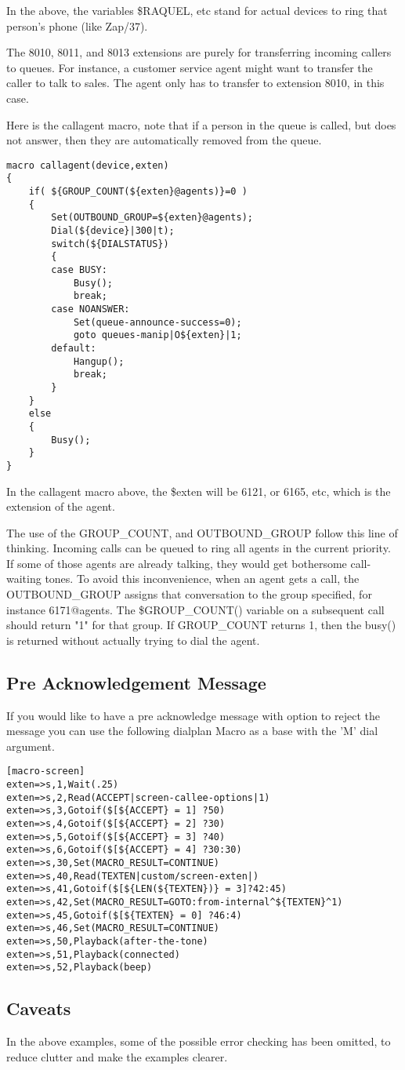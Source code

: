 In the above, the variables \${RAQUEL}, etc stand for
actual devices to ring that person's
phone (like Zap/37).

The 8010, 8011, and 8013 extensions are purely for transferring
incoming callers to queues. For instance, a customer service 
agent might want to transfer the caller to talk to sales. The 
agent only has to transfer to extension 8010, in this case.

Here is the callagent macro, note that if a person in the
queue is called, but does not answer, then they are automatically
removed from the queue.

\begin{verbatim}
macro callagent(device,exten)
{
	if( ${GROUP_COUNT(${exten}@agents)}=0 )
	{
		Set(OUTBOUND_GROUP=${exten}@agents);
		Dial(${device}|300|t);
		switch(${DIALSTATUS})
		{
		case BUSY:
			Busy();
			break;
		case NOANSWER:
			Set(queue-announce-success=0);
			goto queues-manip|O${exten}|1;
		default:
			Hangup();
			break;
		}
	}
	else
	{
		Busy();
	}
}
\end{verbatim}

In the callagent macro above, the \${exten} will
be 6121, or 6165, etc, which is the extension of the agent.

The use of the GROUP\_COUNT, and OUTBOUND\_GROUP follow this line
of thinking. Incoming calls can be queued to ring all agents in the
current priority. If some of those agents are already talking, they
would get bothersome call-waiting tones. To avoid this inconvenience,
when an agent gets a call, the OUTBOUND\_GROUP assigns that 
conversation to the group specified, for instance 6171@agents.
The \${GROUP\_COUNT()} variable on a subsequent call should return
"1" for that group. If GROUP\_COUNT returns 1, then the busy() 
is returned without actually trying to dial the agent.

\subsection{Pre Acknowledgement Message}

If you would like to have a pre acknowledge message with option to reject the message
you can use the following dialplan Macro as a base with the 'M' dial argument.

\begin{verbatim}
[macro-screen]
exten=>s,1,Wait(.25)
exten=>s,2,Read(ACCEPT|screen-callee-options|1)
exten=>s,3,Gotoif($[${ACCEPT} = 1] ?50)
exten=>s,4,Gotoif($[${ACCEPT} = 2] ?30)
exten=>s,5,Gotoif($[${ACCEPT} = 3] ?40)
exten=>s,6,Gotoif($[${ACCEPT} = 4] ?30:30)
exten=>s,30,Set(MACRO_RESULT=CONTINUE)
exten=>s,40,Read(TEXTEN|custom/screen-exten|)
exten=>s,41,Gotoif($[${LEN(${TEXTEN})} = 3]?42:45)
exten=>s,42,Set(MACRO_RESULT=GOTO:from-internal^${TEXTEN}^1)
exten=>s,45,Gotoif($[${TEXTEN} = 0] ?46:4)
exten=>s,46,Set(MACRO_RESULT=CONTINUE)
exten=>s,50,Playback(after-the-tone)
exten=>s,51,Playback(connected)
exten=>s,52,Playback(beep)
\end{verbatim}

\subsection{Caveats}

In the above examples, some of the possible error checking has been omitted,
to reduce clutter and make the examples clearer.
